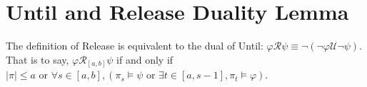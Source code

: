 \documentclass[runningheads]{llncs}
\renewcommand{\phi}{\varphi}
\begin{document}
 

 \section{Until and Release Duality Lemma} \label{duality appendix}
 \begin{lemma}\label{dual_proof}
 The definition of Release is equivalent to the dual of Until: 
 $\phi \mathcal{R} \psi \equiv \neg (\neg \phi \mathcal{U} \neg \psi)$. That is to say,
$\phi \mathcal{R}_{[a,b]} \psi$ if and only if $|\pi| \le a \text{ or } \forall s \in [a,b] ,(\pi_s \vDash \psi \text{ or } \exists t \in [a, s-1] , \pi_t \vDash \phi)$.
 \end{lemma}
 
\end{document}
